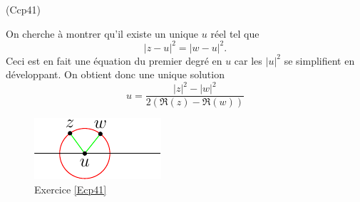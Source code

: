 \begin{tiny}(Ccp41)\end{tiny} On cherche à montrer qu'il existe un unique $u$ réel tel que
\begin{displaymath}
  \left|z-u\right|^2 = \left|w-u\right|^2.
\end{displaymath}
Ceci est en fait une équation du premier degré en $u$ car les $|u|^2$ se simplifient en développant. On obtient donc une unique solution
\begin{displaymath}
  u = 
  \frac{|z|^2-|w|^2}{2\left( \Re(z) - \Re(w)\right) }
\end{displaymath}
\begin{figure}
  \centering
  \includegraphics{./Ccp41_1.pdf}
  \caption{Exercice \ref{Ecp41}}
  \label{fig: Ccp41_1}
\end{figure}


